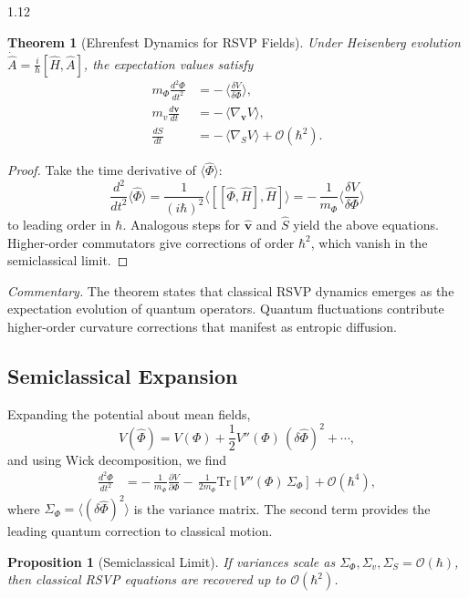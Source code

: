 \documentclass[12pt,a4paper]{article}
\numberwithin{equation}{section}
\newtheorem{proposition}{Proposition}[section]
\newtheorem{theorem}{Theorem}[section]
\theoremstyle{remark}
\theoremstyle{definition}
\begin{document}
\begin{spacing}{1.12}
\begin{theorem}[Ehrenfest Dynamics for RSVP Fields]\label{thm:ehrenfest}
Under Heisenberg evolution \(\dot{\hat{A}} = \tfrac{i}{\hbar}[\hat{H},\hat{A}]\),
the expectation values satisfy
\begin{align}
m_\Phi \frac{d^2\Phi}{dt^2} &= -\,\big\langle \frac{\delta V}{\delta \Phi}\big\rangle, \\
m_v \frac{d\mathbf{v}}{dt}  &= -\,\big\langle \nabla_\mathbf{v} V \big\rangle,\\
\frac{dS}{dt} &= -\,\big\langle \nabla_S V \big\rangle + \mathcal{O}(\hbar^2).
\end{align}
\end{theorem}

\begin{proof}
Take the time derivative of \(\langle \hat{\Phi} \rangle\):
\[
\frac{d^2}{dt^2}\langle \hat{\Phi}\rangle
= \frac{1}{(i\hbar)^2}\langle [[\hat{\Phi},\hat{H}],\hat{H}]\rangle
= -\,\frac{1}{m_\Phi}\langle \frac{\delta V}{\delta \Phi}\rangle
\]
to leading order in \(\hbar\).
Analogous steps for \(\hat{\mathbf{v}}\) and \(\hat{S}\) yield the above equations.
Higher-order commutators give corrections of order \(\hbar^2\),
which vanish in the semiclassical limit.
\end{proof}

\noindent\textit{Commentary.}
The theorem states that classical RSVP dynamics emerges as the expectation evolution of quantum operators.
Quantum fluctuations contribute higher-order curvature corrections that manifest as entropic diffusion.

\subsection{Semiclassical Expansion}

Expanding the potential about mean fields,
\[
V(\hat{\Phi}) = V(\Phi) +
\frac{1}{2}V''(\Phi)\,(\delta\hat{\Phi})^2 + \cdots,
\]
and using Wick decomposition, we find
\begin{align}
\frac{d^2\Phi}{dt^2}
&= -\,\frac{1}{m_\Phi}\frac{\partial V}{\partial \Phi}
 -\,\frac{1}{2m_\Phi}\mathrm{Tr}\!\left[V''(\Phi)\,\Sigma_\Phi\right] + \mathcal{O}(\hbar^4),
\end{align}
where \(\Sigma_\Phi = \langle (\delta\hat{\Phi})^2\rangle\) is the variance matrix.
The second term provides the leading quantum correction to classical motion.

\begin{proposition}[Semiclassical Limit]
If variances scale as \(\Sigma_\Phi,\Sigma_v,\Sigma_S = \mathcal{O}(\hbar)\),
then classical RSVP equations are recovered up to \(\mathcal{O}(\hbar^2)\).
\end{proposition}


\end{spacing}
\end{document}
